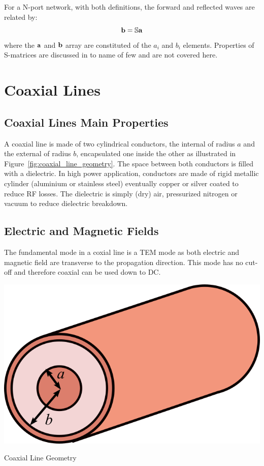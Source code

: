 For a N-port network, with both definitions, the forward and reflected waves are related by:
\begin{equation}
	{\mathbf b} = {\mathbb S} {\mathbf a}
\end{equation}
where the ${\mathbf a}$ and ${\mathbf b}$ array are constituted of the $a_i$ and $b_i$ elements. Properties of S-matrices are discussed in  to name of few and are not covered here.




\section{Coaxial Lines}\label{sec:coaxial_lines}
\subsection{Coaxial Lines Main Properties}
A coaxial line is made of two cylindrical conductors, the internal of radius $a$ and the external of radius $b$, encapsulated one inside the other as illustrated in Figure~\ref{fig:coaxial_line_geometry}. The space between both conductors is filled with a dielectric. In high power application, conductors are made of rigid metallic cylinder (aluminium or stainless steel) eventually copper or silver coated to reduce RF losses. The dielectric is simply (dry) air, pressurized nitrogen or vacuum to reduce dielectric breakdown. 

\subsection{Electric and Magnetic Fields}
The fundamental mode in a coxial line is a TEM mode as both electric and magnetic field are transverse to the propagation direction. This mode has no cut-off and therefore coaxial can be used down to DC.

\begin{marginfigure}[*-10]
	\includegraphics[width=1\linewidth]{figures/chap3/coaxial}
	\caption{Coaxial Line Geometry}
	\label{fig:coaxial_line_geometry}
\end{marginfigure}

